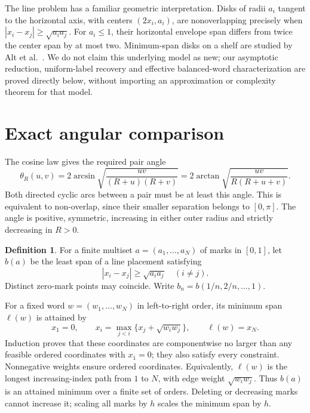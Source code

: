 \documentclass[11pt]{article}
\theoremstyle{definition}\newtheorem{definition}[theorem]{Definition}
\theoremstyle{remark}\newtheorem{remark}[theorem]{Remark}
\DeclareMathOperator{\atan}{arctan}
\DeclareMathOperator{\asin}{arcsin}
\begin{document}
The line problem has a familiar geometric interpretation. Disks of radii
$a_i$ tangent to the horizontal axis, with centers $(2x_i,a_i)$, are
nonoverlapping precisely when $|x_i-x_j|\ge\sqrt{a_i a_j}$.
For $a_i\le1$, their horizontal envelope span differs from twice the
center span by at most two. Minimum-span disks on a shelf are studied by
Alt et al.\ \cite{shelf}. We do not claim this underlying model as new;
our asymptotic reduction, uniform-label recovery and effective balanced-word
characterization are proved directly below, without importing an approximation
or complexity theorem for that model.

\section{Exact angular comparison}\label{sec:line}

The cosine law gives the required pair angle
\begin{equation}\label{eq:theta}
 \theta_R(u,v)=2\asin\sqrt{\frac{uv}{(R+u)(R+v)}}
 =2\atan\sqrt{\frac{uv}{R(R+u+v)}}.
\end{equation}
Both directed cyclic arcs between a pair must be at least this angle.
This is equivalent to non-overlap, since their smaller separation belongs
to $[0,\pi]$. The angle is positive, symmetric, increasing in either
outer radius and strictly decreasing in $R>0$.

\begin{definition}
For a finite multiset $a=(a_1,\ldots,a_N)$ of marks in $[0,1]$, let $b(a)$
be the least span of a line placement satisfying
\begin{equation}\label{eq:line}
 |x_i-x_j|\ge\sqrt{a_i a_j}\quad(i\ne j).
\end{equation}
Distinct zero-mark points may coincide. Write $b_n=b(1/n,2/n,\ldots,1)$.
\end{definition}

For a fixed word $w=(w_1,\ldots,w_N)$ in left-to-right order, its minimum
span $\ell(w)$ is attained by
\begin{equation}\label{eq:recurrence}
 x_1=0,\qquad x_i=\max_{j<i}\{x_j+\sqrt{w_iw_j}\},\qquad \ell(w)=x_N.
\end{equation}
Induction proves that these coordinates are componentwise no larger than
any feasible ordered coordinates with $x_1=0$; they also satisfy every
constraint. Nonnegative weights ensure ordered coordinates. Equivalently,
$\ell(w)$ is the longest increasing-index path from $1$ to $N$, with
edge weight $\sqrt{w_iw_j}$. Thus $b(a)$ is an attained minimum over a
finite set of orders. Deleting or decreasing marks cannot increase it;
scaling all marks by $h$ scales the minimum span by $h$.
\end{document}
